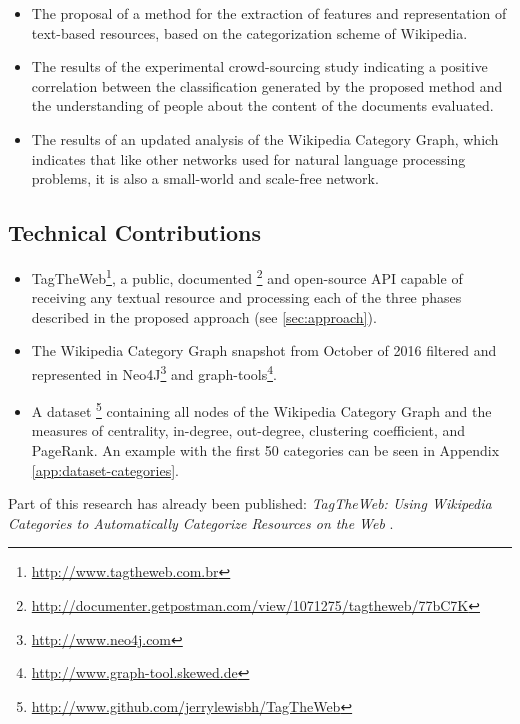 \begin{itemize}
\item The proposal of a method for the extraction of features and representation of text-based resources, based on the categorization scheme of Wikipedia.

\item The results of the experimental crowd-sourcing study indicating a positive correlation between the classification generated by the proposed method and the understanding of people about the content of the documents evaluated.

\item The results of an updated analysis of the Wikipedia Category Graph, which indicates that like other networks used for natural language processing problems, it is also a small-world and scale-free network.


\end{itemize}


\subsection{\hspace*{3pt}Technical Contributions}

\begin{itemize}
\item TagTheWeb\footnote{\url{http://www.tagtheweb.com.br}}, a public, documented \footnote{\url{http://documenter.getpostman.com/view/1071275/tagtheweb/77bC7K}} and open-source API capable of receiving any textual resource and processing each of the three phases described in the proposed approach (see \ref{sec:approach}).

\item  The Wikipedia Category Graph snapshot from October of 2016 filtered and represented in Neo4J\footnote{\url{http://www.neo4j.com}} and graph-tools\footnote{\url{http://www.graph-tool.skewed.de}}.  

\item A dataset \footnote {\url{http://www.github.com/jerrylewisbh/TagTheWeb}} containing all nodes of the Wikipedia Category Graph and the measures of centrality, in-degree, out-degree, clustering coefficient, and PageRank. An example with the first 50 categories can be seen in Appendix \ref{app:dataset-categories}.

\end{itemize}
Part of this research has already been published: \textit{TagTheWeb: Using Wikipedia Categories to Automatically Categorize Resources on the Web} \cite{medeiros2018tagtheweb}.

